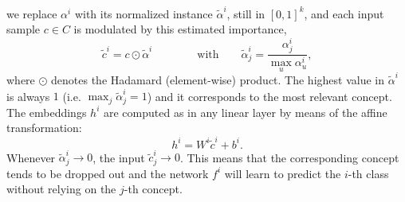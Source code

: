 we replace $\alpha^i$ with its normalized instance $\tilde{\alpha}^i$, still  in $[0,1]^k$,
and each input sample %
$c \in C$ is modulated by this %
estimated importance, %
\begin{equation} \label{eq:drop}
    \tilde{c}^i = c \odot \tilde{\alpha}^i \qquad\qquad \text{with} \qquad \tilde{\alpha}_j^i = \frac{\alpha_j^i}{\max_u \alpha_u^i},
\end{equation}
where $\odot$ denotes the Hadamard (element-wise) product.
The highest value in $\tilde{\alpha}^i$ is always $1$ (i.e. $\max_j \tilde{\alpha}_j^i = 1$) and it corresponds to the most relevant concept. 
The embeddings $h^i$ are computed as in any linear layer by means of the affine transformation:
\begin{equation} \label{eq:forward}
    h^i = W^i \tilde{c}^i + b^i.
\end{equation}
Whenever $\tilde{\alpha}_j^i \rightarrow 0$, the input $\tilde{c}_j^i \rightarrow 0$.
This means that the corresponding concept tends to be dropped out and the network $f^i$ will learn to predict the $i$-th class without 
relying on %
the $j$-th concept. 

